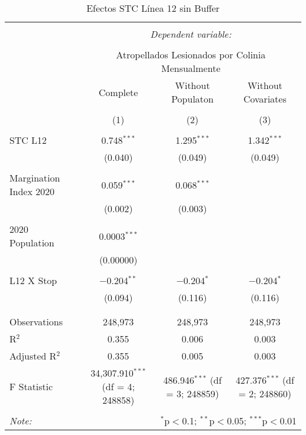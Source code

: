 
\begin{table}[!htbp] \centering 
  \caption{Efectos STC Línea 12 sin Buffer} 
  \label{} 
\begin{tabular}{@{\extracolsep{5pt}}lccc} 
\\[-1.8ex]\hline 
\hline \\[-1.8ex] 
 & \multicolumn{3}{c}{\textit{Dependent variable:}} \\ 
\cline{2-4} 
\\[-1.8ex] & \multicolumn{3}{c}{Atropellados Lesionados por Colinia Mensualmente} \\ 
 & Complete & Without Populaton & Without Covariates \\ 
\\[-1.8ex] & (1) & (2) & (3)\\ 
\hline \\[-1.8ex] 
 STC L12 & 0.748$^{***}$ & 1.295$^{***}$ & 1.342$^{***}$ \\ 
  & (0.040) & (0.049) & (0.049) \\ 
  & & & \\ 
 Margination Index 2020 & 0.059$^{***}$ & 0.068$^{***}$ &  \\ 
  & (0.002) & (0.003) &  \\ 
  & & & \\ 
 2020 Population & 0.0003$^{***}$ &  &  \\ 
  & (0.00000) &  &  \\ 
  & & & \\ 
 L12 X Stop & $-$0.204$^{**}$ & $-$0.204$^{*}$ & $-$0.204$^{*}$ \\ 
  & (0.094) & (0.116) & (0.116) \\ 
  & & & \\ 
\hline \\[-1.8ex] 
Observations & 248,973 & 248,973 & 248,973 \\ 
R$^{2}$ & 0.355 & 0.006 & 0.003 \\ 
Adjusted R$^{2}$ & 0.355 & 0.005 & 0.003 \\ 
F Statistic & 34,307.910$^{***}$ (df = 4; 248858) & 486.946$^{***}$ (df = 3; 248859) & 427.376$^{***}$ (df = 2; 248860) \\ 
\hline 
\hline \\[-1.8ex] 
\textit{Note:}  & \multicolumn{3}{r}{$^{*}$p$<$0.1; $^{**}$p$<$0.05; $^{***}$p$<$0.01} \\ 
\end{tabular} 
\end{table} 

